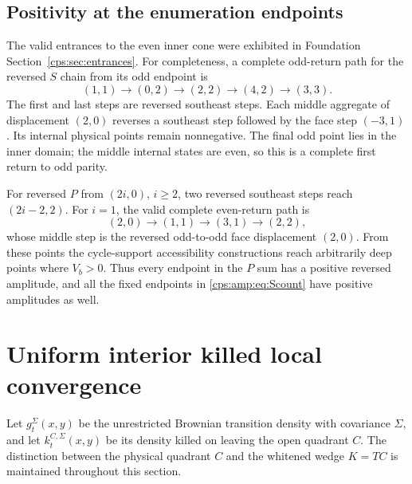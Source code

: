 \documentclass[11pt,letterpaper]{article}
\numberwithin{equation}{section}
\theoremstyle{remark}\newtheorem{remark}[theorem]{Remark}
\begin{document}
\subsection{Positivity at the enumeration endpoints}
The valid entrances to the even inner cone were exhibited in Foundation Section~\ref{cps:sec:entrances}. For completeness, a complete odd-return path for the reversed $S$ chain from its odd endpoint is
\begin{equation}\label{cps:amp:eq:oddentrance}
 (1,1)\longrightarrow(0,2)\longrightarrow(2,2)
 \longrightarrow(4,2)\longrightarrow(3,3).
\end{equation}
The first and last steps are reversed southeast steps. Each middle aggregate of displacement $(2,0)$ reverses a southeast step followed by the face step $(-3,1)$. Its internal physical points remain nonnegative. The final odd point lies in the inner domain; the middle internal states are even, so this is a complete first return to odd parity.

For reversed $P$ from $(2i,0)$, $i\ge2$, two reversed southeast steps reach $(2i-2,2)$. For $i=1$, the valid complete even-return path is
\begin{equation}
 (2,0)\longrightarrow(1,1)\longrightarrow(3,1)\longrightarrow(2,2),
\end{equation}
whose middle step is the reversed odd-to-odd face displacement $(2,0)$. From these points the cycle-support accessibility constructions reach arbitrarily deep points where $V_b>0$. Thus every endpoint in the $P$ sum has a positive reversed amplitude, and all the fixed endpoints in \eqref{cps:amp:eq:Scount} have positive amplitudes as well.

\section{Uniform interior killed local convergence}\label{cps:amp:sec:killed}
Let $g_t^\Sigma(x,y)$ be the unrestricted Brownian transition density with covariance $\Sigma$, and let $k_t^{C,\Sigma}(x,y)$ be its density killed on leaving the open quadrant $C$. The distinction between the physical quadrant $C$ and the whitened wedge $K=TC$ is maintained throughout this section.
\end{document}
